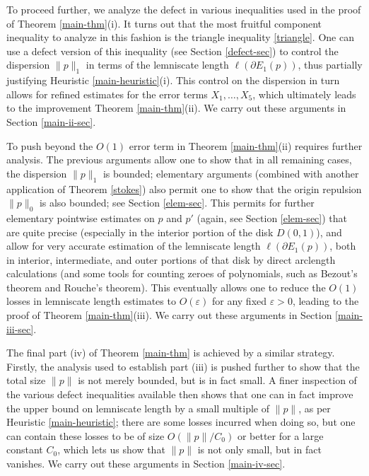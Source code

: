 \documentclass[12pt]{amsart}
\newcommand{\eps}{\varepsilon}
\begin{document}
To proceed further, we analyze the defect in various inequalities used in the proof of Theorem \ref{main-thm}(i).  It turns out that the most fruitful component inequality to analyze in this fashion is the triangle inequality \eqref{triangle}.  One can use a defect version of this inequality (see Section \ref{defect-sec}) to control the dispersion $\|p\|_1$ in terms of the lemniscate length $\ell(\partial E_1(p))$, thus partially justifying Heuristic \ref{main-heuristic}(i).  This control on the dispersion in turn allows for refined estimates for the error terms $X_1,\dots,X_5$, which ultimately leads to the improvement Theorem \ref{main-thm}(ii).  We carry out these arguments in Section \ref{main-ii-sec}.

To push beyond the $O(1)$ error term in Theorem \ref{main-thm}(ii) requires further analysis.  The previous arguments allow one to show that in all remaining cases, the dispersion $\|p\|_1$ is bounded; elementary arguments (combined with another application of Theorem \ref{stokes}) also permit one to show that the origin repulsion $\|p\|_0$ is also bounded; see Section \ref{elem-sec}.  This permits for further elementary pointwise estimates on $p$ and $p'$ (again, see Section \ref{elem-sec}) that are quite precise (especially in the interior portion of the disk $D(0,1)$), and allow for very accurate estimation of the lemniscate length $\ell(\partial E_1(p))$, both in interior, intermediate, and outer portions of that disk by direct arclength calculations (and some tools for counting zeroes of polynomials, such as Bezout's theorem and Rouche's theorem).  This eventually allows one to reduce the $O(1)$ losses in lemniscate length estimates to $O(\eps)$ for any fixed $\eps>0$, leading to the proof of Theorem \ref{main-thm}(iii). We carry out these arguments in Section \ref{main-iii-sec}.

The final part (iv) of Theorem \ref{main-thm} is achieved by a similar strategy.  Firstly, the analysis used to establish part (iii) is pushed further to show that the total size $\|p\|$ is not merely bounded, but is in fact small.  A finer inspection of the various defect inequalities available then shows that one can in fact improve the upper bound on lemniscate length by a small multiple of $\|p\|$, as per Heuristic \ref{main-heuristic}; there are some losses incurred when doing so, but one can contain these losses to be of size $O(\|p\|/C_0)$ or better for a large constant $C_0$, which lets us show that $\|p\|$ is not only small, but in fact vanishes.  We carry out these arguments in Section \ref{main-iv-sec}.
\end{document}
